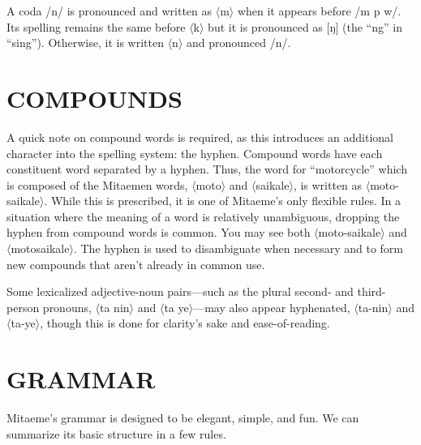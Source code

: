 \documentclass[a4paper]{article}
\begin{document}
A coda /n/ is pronounced and written as $\langle$m$\rangle$ when it appears before /m p w/. Its spelling remains the same before $\langle$k$\rangle$ but it is pronounced as [ŋ] (the ``ng'' in ``sing''). Otherwise, it is written $\langle$n$\rangle$ and pronounced /n/.

\section{COMPOUNDS}

A quick note on compound words is required, as this introduces an additional character into the spelling system: the hyphen. Compound words have each constituent word separated by a hyphen. Thus, the word for ``motorcycle'' which is composed of the Mitaemen words, $\langle$moto$\rangle$  and $\langle$saikale$\rangle$, is written as $\langle$moto-saikale$\rangle$. While this is prescribed, it is one of Mitaeme's only flexible rules. In a situation where the meaning of a word is relatively unambiguous, dropping the hyphen from compound words is common. You may see both $\langle$moto-saikale$\rangle$ and $\langle$motosaikale$\rangle$. The hyphen is used to disambiguate when necessary and to form new compounds that aren't already in common use.

Some lexicalized adjective-noun pairs—such as the plural second- and third-person pronouns, $\langle$ta nin$\rangle$ and $\langle$ta ye$\rangle$—may also appear hyphenated,  $\langle$ta-nin$\rangle$ and $\langle$ta-ye$\rangle$, though this is done for clarity's sake and ease-of-reading.

\section{GRAMMAR}

Mitaeme's grammar is designed to be elegant,  simple, and fun. We can summarize its basic structure in a few rules.
\end{document}
